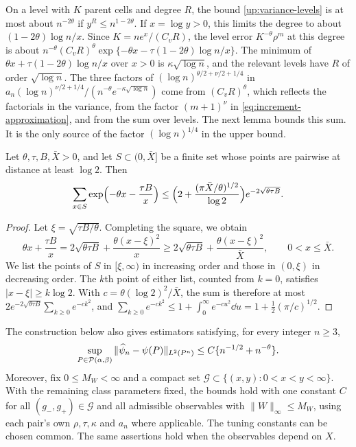 On a level with $K$ parent cells
and degree $R$, the bound \eqref{up:variance-levels} is at most about
$n^{-2\theta}$ if $y^R\le n^{1-2\theta}$. If $x=\log y>0$, this limits the
degree to about $(1-2\theta)\log n/x$. Since $K=ne^x/(C_vR)$, the level
error $K^{-\theta}\rho^m$ at this degree is about
$n^{-\theta}(C_vR)^\theta\exp\{-\theta x-\tau(1-2\theta)\log n/x\}$. The
minimum of $\theta x+\tau(1-2\theta)\log n/x$ over $x>0$ is
$\kappa\sqrt{\log n}$, and the relevant levels have $R$ of order
$\sqrt{\log n}$. The three factors of $(\log n)^{\theta/2+\nu/2+1/4}$ in
$a_n(\log n)^{\nu/2+1/4}/(n^{-\theta}e^{-\kappa\sqrt{\log n}})$ come from
$(C_vR)^\theta$, which reflects the factorials in the variance, from the
factor $(m+1)^\nu$ in \eqref{eq:increment-approximation}, and from the sum
over levels. The next lemma bounds this sum. It is the only source of the
factor $(\log n)^{1/4}$ in the upper bound.

\begin{lemma}\label{lem:window-sum}
Let $\theta,\tau,B,\bar X>0$, and let $S\subset(0,\bar X]$ be a finite
set whose points are pairwise at distance at least $\log2$. Then
\[
 \sum_{x\in S}\exp\Bigl(-\theta x-\frac{\tau B}x\Bigr)
 \le\Bigl(2+\frac{(\pi\bar X/\theta)^{1/2}}{\log2}\Bigr)
     e^{-2\sqrt{\theta\tau B}}.
\]
\end{lemma}
\begin{proof}
Let $\xi=\sqrt{\tau B/\theta}$. Completing the square, we obtain
\[
 \theta x+\frac{\tau B}x=2\sqrt{\theta\tau B}+\frac{\theta(x-\xi)^2}x
 \ge2\sqrt{\theta\tau B}+\frac{\theta(x-\xi)^2}{\bar X},
 \qquad0<x\le\bar X.
\]
We list the points of $S$ in $[\xi,\infty)$ in increasing order and those
in $(0,\xi)$ in decreasing order. The $k$th point of either list, counted
from $k=0$, satisfies $|x-\xi|\ge k\log2$. With
$c=\theta(\log2)^2/\bar X$, the sum is therefore at most
$2e^{-2\sqrt{\theta\tau B}}\sum_{k\ge0}e^{-ck^2}$, and
$\sum_{k\ge0}e^{-ck^2}\le1+\int_0^\infty e^{-cu^2}\dd u
=1+\frac12(\pi/c)^{1/2}$.
\end{proof}

The construction below also gives estimators satisfying, for every
integer $n\ge3$,
\begin{equation}\label{eq:basic-upper}
 \sup_{P\in\mathcal P(\alpha,\beta)}
 \|\widehat\psi_n-\psi(P)\|_{L^2(P^n)}
 \le C\{n^{-1/2}+n^{-\theta}\}.
\end{equation}
Moreover, fix $0\le M_W<\infty$ and a compact set
$\mathcal G\subset\{(x,y):0<x<y<\infty\}$.
With the remaining class parameters fixed, the bounds hold with
one constant $C$ for all $(g_-,g_+)\in\mathcal G$ and all admissible
observables with $\|W\|_\infty\le M_W$, using each pair's own
$\rho,\tau,\kappa$ and $a_n$ where applicable.
The tuning constants can be chosen common.
The same assertions hold when the observables depend on $X$.

